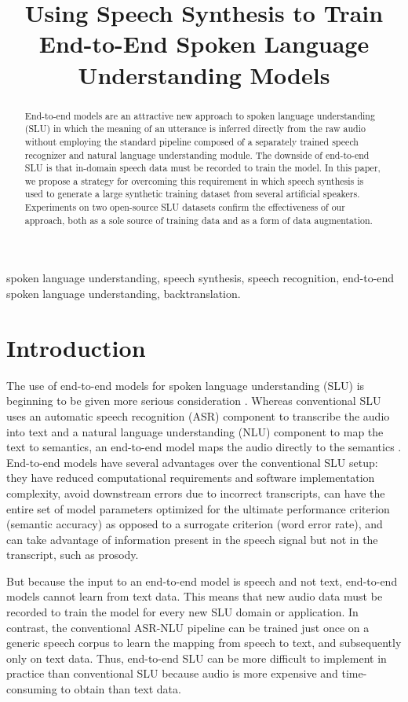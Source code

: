 \documentclass{article}
\title{Using Speech Synthesis to Train End-to-End Spoken Language Understanding Models}
\begin{document}
\maketitle
\begin{abstract}
End-to-end models are an attractive new approach to spoken language understanding (SLU) in which the meaning of an utterance is inferred directly from the raw audio without employing the standard pipeline composed of a separately trained speech recognizer and natural language understanding module. 
The downside of end-to-end SLU is that in-domain speech data must be recorded to train the model. In this paper, we propose a strategy for overcoming this requirement in which speech synthesis is used to generate a large synthetic training dataset from several artificial speakers.  Experiments on two open-source SLU datasets confirm the effectiveness of our approach, both as a sole source of training data and as a form of data augmentation. 

\end{abstract}
\begin{keywords}
spoken language understanding, speech synthesis, speech recognition, end-to-end spoken language understanding, backtranslation.
\end{keywords}
\section{Introduction}
\label{sec:intro}
The use of end-to-end models for spoken language understanding (SLU) is beginning to be given more serious consideration \cite{tomashenko2019recent, Haghani2018, bhosale2019end, caubriere2019curriculum}.
Whereas conventional SLU uses an automatic speech recognition (ASR) component to transcribe the audio into text and a natural language understanding (NLU) component to map the text to semantics, an end-to-end model maps the audio directly to the semantics \cite{Qian2017, Serdyuk2018, Chen2018}. End-to-end models have several advantages over the conventional SLU setup: they have reduced computational requirements and software implementation complexity, avoid downstream errors due to incorrect transcripts, can have the entire set of model parameters optimized for the ultimate performance criterion (semantic accuracy) as opposed to a surrogate criterion (word error rate), and can take advantage of information present in the speech signal but not in the transcript, such as prosody.

But because the input to an end-to-end model is speech and not text, end-to-end models cannot learn from text data. This means that new audio data
must be recorded to train the model for every new SLU domain or application. In contrast, the conventional ASR-NLU pipeline can be trained just once on a generic speech corpus to learn the mapping from speech to text, and subsequently only on text data. Thus, end-to-end SLU can be more difficult to implement in practice than conventional SLU because audio is more expensive and time-consuming to obtain than text data.
\end{document}

